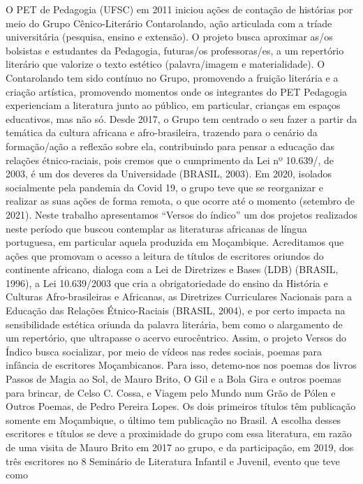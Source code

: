 O PET de Pedagogia (UFSC) em 2011 iniciou ações de contação de histórias por meio do 
Grupo Cênico-Literário Contarolando, ação articulada com a tríade universitária (pesquisa, ensino 
e extensão). O projeto busca aproximar as/os bolsistas e estudantes da Pedagogia, futuras/os 
professoras/es, a um repertório literário que valorize o texto estético (palavra/imagem e 
materialidade). O Contarolando tem sido contínuo no Grupo, promovendo a fruição literária e a 
criação artística, promovendo momentos onde os integrantes do PET Pedagogia experienciam a 
literatura junto ao público, em particular, crianças em espaços educativos, mas não só. Desde 2017, 
o Grupo tem centrado o seu fazer a partir da temática da cultura africana e afro-brasileira, trazendo
para o cenário da formação/ação a reflexão sobre ela, contribuindo para pensar a educação das 
relações étnico-raciais, pois cremos que o cumprimento da Lei nº 10.639/, de 2003, é um dos 
deveres da Universidade (BRASIL, 2003). Em 2020, isolados socialmente pela pandemia da Covid 
19, o grupo teve que se reorganizar e realizar as suas ações de forma remota, o que ocorre até o 
momento (setembro de 2021). Neste trabalho apresentamos “Versos do índico” um dos projetos 
realizados neste período que buscou contemplar as literaturas africanas de língua portuguesa, em 
particular aquela produzida em Moçambique.
Acreditamos que ações que promovam o acesso a leitura de títulos de escritores oriundos 
do continente africano, dialoga com a Lei de Diretrizes e Bases (LDB) (BRASIL, 1996), a Lei 
10.639/2003 que cria a obrigatoriedade do ensino da História e Culturas Afro-brasileiras e 
Africanas, as Diretrizes Curriculares Nacionais para a Educação das Relações Étnico-Raciais 
(BRASIL, 2004), e por certo impacta na sensibilidade estética oriunda da palavra literária, bem 
como o alargamento de um repertório, que ultrapasse o acervo eurocêntrico. 
Assim, o projeto Versos do Índico busca socializar, por meio de vídeos nas redes sociais, 
poemas para infância de escritores Moçambicanos. Para isso, detemo-nos nos poemas dos livros 
Passos de Magia ao Sol, de Mauro Brito, O Gil e a Bola Gira e outros poemas para brincar, de 
Celso C. Cossa, e Viagem pelo Mundo num Grão de Pólen e Outros Poemas, de Pedro Pereira
Lopes. Os dois primeiros títulos têm publicação somente em Moçambique, o último tem 
publicação no Brasil. A escolha desses escritores e títulos se deve a proximidade do grupo com 
essa literatura, em razão de uma visita de Mauro Brito em 2017 ao grupo, e da participação, em 
2019, dos três escritores no 8 Seminário de Literatura Infantil e Juvenil, evento que teve como 
